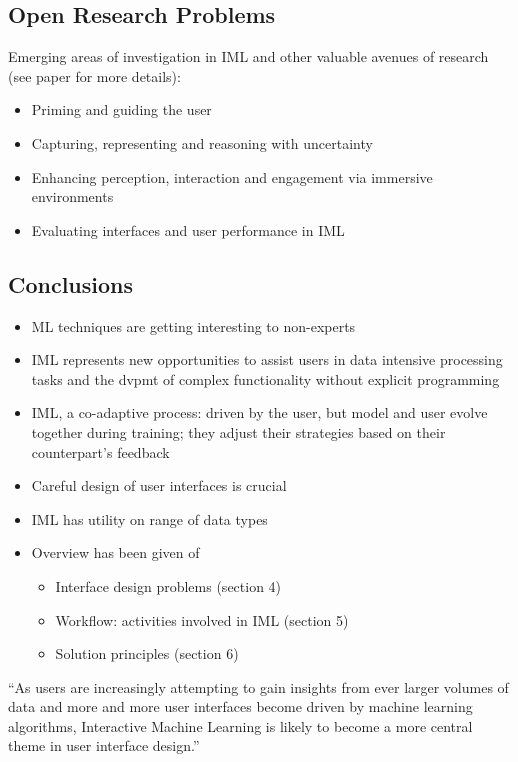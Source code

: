 \documentclass[12pt,a4paper]{article}
\begin{document}
\subsection{Open Research Problems}
Emerging areas of investigation in IML and other valuable avenues of research (see paper for more details):
\begin{itemize}
\item Priming and guiding the user
\item Capturing, representing and reasoning with uncertainty
\item Enhancing perception, interaction and engagement via immersive environments
\item Evaluating interfaces and user performance in IML
\end{itemize}
%
%
\subsection{Conclusions}
\begin{itemize}
\item ML techniques are getting interesting to non-experts
\item IML represents new opportunities to assist users in data intensive processing tasks and the dvpmt of complex functionality without explicit programming
\item IML, a co-adaptive process: driven by the user, but model and user evolve together during training; they adjust their strategies based on their counterpart's feedback
\item Careful design of user interfaces is crucial
\item IML has utility on range of data types
\item Overview has been given of 
\begin{itemize}
\item Interface design problems (section 4)
\item Workflow: activities involved in IML (section 5)
\item Solution principles (section 6)
\end{itemize}
\end{itemize}
\begin{description}
\item ``As users are increasingly attempting to gain insights from ever larger volumes of data and more and more user interfaces become driven by machine learning algorithms, Interactive Machine Learning is likely to become a more central theme in user interface design.''
\end{description}
%
%
%
%
%
\end{document}
